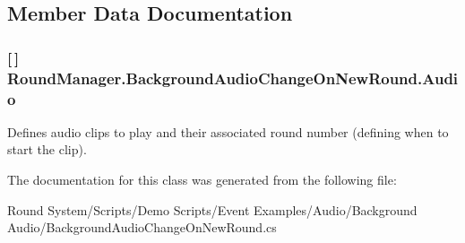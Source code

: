 \subsection{Member Data Documentation}
\hypertarget{class_round_manager_1_1_background_audio_change_on_new_round_ad7f96bc656537dedf4282c2be974fffd}{}
\subsubsection[{Audio}]{ \mbox{[}$\,$\mbox{]} Round\+Manager.\+Background\+Audio\+Change\+On\+New\+Round.\+Audio}\label{class_round_manager_1_1_background_audio_change_on_new_round_ad7f96bc656537dedf4282c2be974fffd}


Defines audio clips to play and their associated round number (defining when to start the clip). 



The documentation for this class was generated from the following file\+:\begin{DoxyCompactItemize}
\item 
Round System/\+Scripts/\+Demo Scripts/\+Event Examples/\+Audio/\+Background Audio/Background\+Audio\+Change\+On\+New\+Round.\+cs\end{DoxyCompactItemize}
